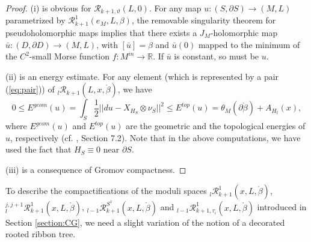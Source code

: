 \documentclass[a4paper]{article}
\numberwithin{equation}{section}
\begin{document}
\begin{proof}
(i) is obvious for $\mathcal{R}_{k+1,\vartheta}(L,0)$. For any map $u:(S,\partial S)\rightarrow(M,L)$ parametrized by $\mathcal{R}_{k+1}^1(e_M,L,\beta)$, the removable singularity theorem for pseudoholomorphic maps implies that there exists a $J_M$-holomorphic map $\bar{u}:(D,\partial D)\rightarrow(M,L)$, with $\left[\bar{u}\right]=\beta$ and $\bar{u}(0)$ mapped to the minimum of the $C^2$-small Morse function $f:M^\mathit{in}\rightarrow\mathbb{R}$. If $\bar{u}$ is constant, so must be $u$.

(ii) is an energy estimate. For any element (which is represented by a pair (\ref{eq:pair})) of ${}_l\mathcal{R}_{k+1}(L,x,\ring{\beta})$, we have
\begin{equation}\label{eq:energy}
0\leq E^\mathit{geom}(u)=\int_S\frac{1}{2}||du-X_{H_S}\otimes\nu_S||^2\leq E^\mathit{top}(u)=\theta_M(\partial\ring{\beta})+A_{H_t}(x),
\end{equation}
where $E^\mathit{geom}(u)$ and $E^\mathit{top}(u)$ are the geometric and the topological energies of $u$, respectively (cf. \cite{ase}, Section 7.2). Note that in the above computations, we have used the fact that $H_S\equiv0$ near $\partial S$.

(iii) is a consequence of Gromov compactness.
\end{proof}

To describe the compactifications of the moduli spaces ${}_l\mathcal{R}_{k+1}^1(x,L,\ring{\beta})$, ${}_l^{j,j+1}\mathcal{R}_{k+1}^1(x,L,\ring{\beta})$, ${}_{l-1}\mathcal{R}_{k+1}^{S^1}(x,L,\ring{\beta})$ and ${}_{l-1}\mathcal{R}_{k+1,\tau_i}^1(x,L,\ring{\beta})$ introduced in Section \ref{section:CG}, we need a slight variation of the notion of a decorated rooted ribbon tree.
\end{document}
